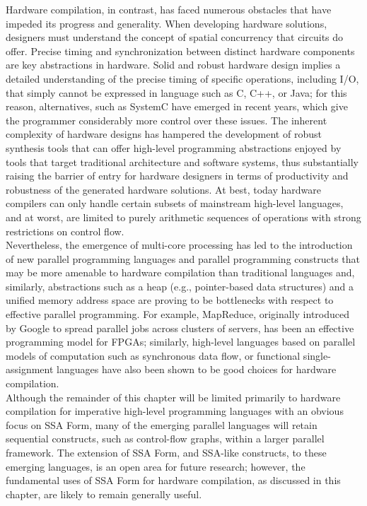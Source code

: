 Hardware compilation, in contrast, has faced numerous obstacles
that have impeded its progress and generality. When developing
hardware solutions, designers must understand 
the concept of spatial concurrency 
that circuits do offer. Precise timing and synchronization between
distinct hardware components are key abstractions in hardware. 
Solid and robust hardware design implies a detailed understanding of 
the precise timing of specific operations, including I/O, that simply 
cannot be expressed in language such as C, C++, or Java; for this reason, 
alternatives, such as SystemC have emerged in 
recent years, which give the programmer considerably more control 
over these issues. 
The inherent complexity of hardware designs has hampered the development 
of robust synthesis tools that can offer high-level programming abstractions 
enjoyed by tools that target traditional architecture and software systems, 
thus substantially raising the barrier of entry for hardware designers in 
terms of productivity and robustness of the generated hardware solutions. 
At best, today hardware compilers can only handle certain subsets of 
mainstream high-level languages, and at worst, are limited to purely 
arithmetic sequences of operations with strong restrictions on control flow.\\

Nevertheless, the emergence of multi-core processing has led to the 
introduction of new parallel programming languages and parallel 
programming constructs that may be more amenable to hardware compilation 
than traditional languages and, similarly, abstractions such as a heap 
(e.g., pointer-based data structures) and a unified memory address space are 
proving to be bottlenecks with respect to effective parallel programming. 
For example, MapReduce, originally introduced by Google to spread parallel 
jobs across clusters of servers, has been an effective 
programming model for FPGAs; similarly, high-level 
languages based on parallel models of computation such as synchronous data 
flow, or functional single-assignment languages have 
also been shown to be good choices for hardware 
compilation.\\

Although the remainder of this chapter will be limited primarily to 
hardware compilation for imperative high-level programming languages
with  an obvious focus on SSA Form, many of the emerging parallel languages will 
retain sequential constructs, such as control-flow graphs, within a larger 
parallel framework. The extension of SSA Form, and SSA-like constructs, to 
these emerging languages, is an open area for future research; however, 
the fundamental uses of SSA Form for hardware compilation, as discussed 
in this chapter, are likely to remain generally useful.\\


